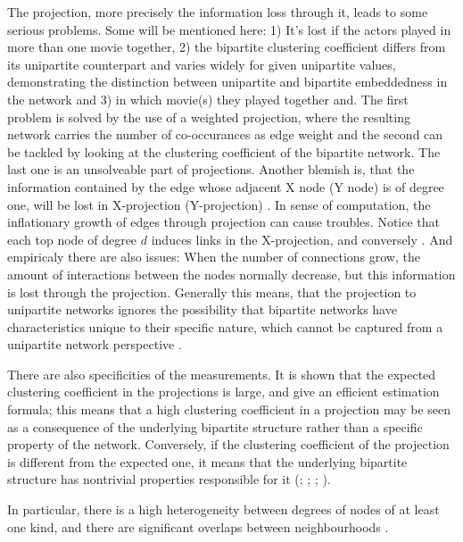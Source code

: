 \documentclass[
a4paper,     %
12pt         %
]{scrartcl}  %
\begin{document}
The projection, more precisely the information loss through it, leads to some serious problems. Some will be mentioned here: 1) It's lost if the actors played in more than one movie together, 2) the bipartite clustering coefficient differs from its unipartite counterpart and varies widely for given unipartite values, demonstrating the distinction between unipartite and bipartite embeddedness in the network \citep{piepenbrink_methodological_2013} and 3) in which movie(s) they played together and. The first problem is solved by the use of a weighted projection, where the resulting network carries the number of co-occurances as edge weight and the second can be tackled by looking at the clustering coefficient of the bipartite network. The last one is an unsolveable part of projections. Another blemish is, that the information contained by the edge whose adjacent X node (Y node) is of degree one, will be lost in X-projection (Y-projection) \citep{zhou_how_2007}. 
In sense of computation, the inflationary growth of edges through projection can cause troubles. Notice that each top node of degree $d$ induces links in the X-projection, and conversely \citep{latapy_basic_2008}. 
And empiricaly there are also issues: When the number of connections grow, the amount of interactions between the nodes normally decrease, but this information is lost through the projection. Generally this means, that the projection to unipartite networks ignores the possibility that bipartite networks have characteristics unique to their specific nature, which cannot be captured from a unipartite network perspective \citep{piepenbrink_methodological_2013}.

There are also specificities of the measurements. It is shown that the expected clustering coefficient in the projections is large, and give an efficient estimation formula; this means that a high clustering coefficient in a projection may be seen as a consequence of the underlying bipartite structure rather than a specific property of the network. Conversely, if the clustering coefficient of the projection is different from the expected one, it means that the underlying bipartite structure has nontrivial properties responsible for it (\cite{latapy_basic_2008}; \cite{newman_random_2001}; \cite{guillaume_bipartite_2004}; \cite{guillaume_bipartite_2006}).

In particular, there is a high heterogeneity between degrees of nodes of at least one kind, and there are significant overlaps between neighbourhoods \citep{latapy_basic_2008}.
\end{document}

